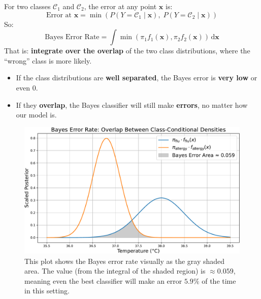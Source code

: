 \highspace
For two classes $\mathcal{C}_1$ and $\mathcal{C}_2$, the error at any point $\mathbf{x}$ is:
\begin{equation}
    \text{Error at } \mathbf{x} = \min \left( P\left(Y = \mathcal{C}_1 \mid \mathbf{x}\right), \; P\left(Y = \mathcal{C}_2 \mid \mathbf{x}\right) \right)
\end{equation}
So:
\begin{equation}
    \text{Bayes Error Rate} = \int \min\left(\pi_{1} f_{1}\left(\mathbf{x}\right), \pi_{2} f_{2}\left(\mathbf{x}\right)\right) \, \mathrm{d}\mathbf{x}
\end{equation}
That is: \textbf{integrate over the overlap} of the two class distributions, where the ``wrong'' class is more likely.
\begin{itemize}
    \item If the class distributions are \textbf{well separated}, the Bayes error is \textbf{very low} or even 0.
    \item If they \textbf{overlap}, the Bayes classifier will still make \textbf{errors}, no matter how our model is.
\end{itemize}

\begin{figure}[!htp]
    \centering
    \includegraphics[width=\textwidth]{img/bayes-classifier/bayes-error-rate.pdf}
    \caption{This plot shows the Bayes error rate visually as the gray shaded area. The value (from the integral of the shaded region) is $\approx 0.059$, meaning even the best classifier will make an error $5.9\%$ of the time in this setting.}
\end{figure}


